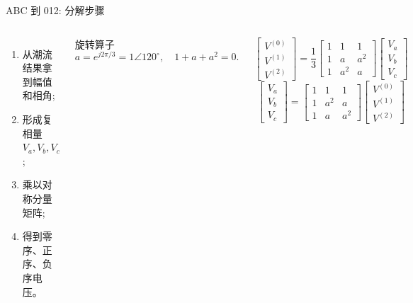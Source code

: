 \documentclass[aspectratio=169,10pt]{ctexbeamer}
\begin{document}
\begin{frame}{ABC 到 012: 分解步骤}
\begin{columns}[T]
\small
\begin{enumerate}
  \item 从潮流结果拿到幅值和相角;
  \item 形成复相量 $V_a,V_b,V_c$;
  \item 乘以对称分量矩阵;
  \item 得到零序、正序、负序电压。
\end{enumerate}
\begin{block}{旋转算子}
\[
a=e^{j2\pi/3}=1\angle120^\circ,\quad
1+a+a^2=0.
\]
\end{block}
\[
\begin{bmatrix}
V^{(0)} \\
V^{(1)} \\
V^{(2)}
\end{bmatrix}
=
\frac{1}{3}
\begin{bmatrix}
1 & 1 & 1 \\
1 & a & a^2 \\
1 & a^2 & a
\end{bmatrix}
\begin{bmatrix}
V_a \\
V_b \\
V_c
\end{bmatrix}
\]
\[
\begin{bmatrix}
V_a\\V_b\\V_c
\end{bmatrix}
=
\begin{bmatrix}
1 & 1 & 1\\
1 & a^2 & a\\
1 & a & a^2
\end{bmatrix}
\begin{bmatrix}
V^{(0)}\\V^{(1)}\\V^{(2)}
\end{bmatrix}
\]
\end{columns}
\end{frame}
\end{document}
